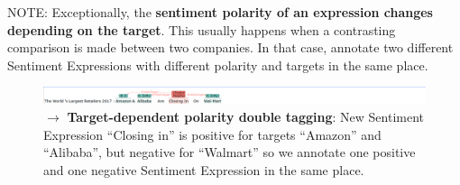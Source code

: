 \newpage
\noindent
\textcolor{BrickRed}{NOTE: Exceptionally, the \textbf{sentiment polarity of an expression changes depending on the target}.
This usually happens when a contrasting comparison is made between two companies.
In that case, annotate two different Sentiment Expressions with different polarity and targets in the same place.}

\begin{figure}[!ht]
    \centering
    \includegraphics[width=\textwidth]{img/amzn00-s01 different entities on new sentiment annotation.png}
    \caption*{$\rightarrow$ \textbf{Target-dependent polarity double tagging}: New Sentiment Expression ``Closing in'' is positive for targets ``Amazon'' and ``Alibaba'', but negative for ``Walmart'' so we annotate one positive and one negative Sentiment Expression in the same place.}
\end{figure}



